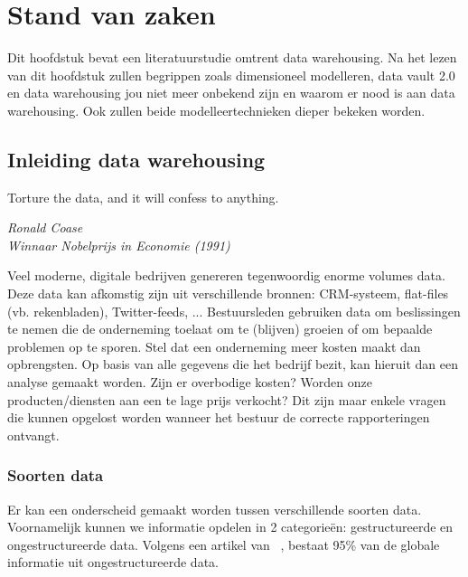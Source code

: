 \chapter{Stand van zaken}
\label{ch:stand-van-zaken}



Dit hoofdstuk bevat een literatuurstudie omtrent data warehousing. Na het lezen van dit hoofdstuk zullen begrippen zoals dimensioneel modelleren, data vault 2.0 en data warehousing jou niet meer onbekend zijn en waarom er nood is aan data warehousing. Ook zullen beide modelleertechnieken dieper bekeken worden.

\section{Inleiding data warehousing}

\epigraph{Torture the data, and it will confess to anything. }{\textit{Ronald Coase \\ Winnaar Nobelprijs in Economie (1991)}}

Veel moderne, digitale bedrijven genereren tegenwoordig enorme volumes data. Deze data kan afkomstig zijn uit verschillende bronnen: CRM-systeem, flat-files (vb. rekenbladen), Twitter-feeds, ... Bestuursleden gebruiken data om beslissingen te nemen die de onderneming toelaat om te (blijven) groeien of om bepaalde problemen op te sporen. Stel dat een onderneming meer kosten maakt dan opbrengsten. Op basis van alle gegevens die het bedrijf bezit, kan hieruit dan een analyse gemaakt worden. Zijn er overbodige kosten? Worden onze producten/diensten aan een te lage prijs verkocht? Dit zijn maar enkele vragen die kunnen opgelost worden wanneer het bestuur de correcte rapporteringen ontvangt. 

\subsection{Soorten data}
Er kan een onderscheid gemaakt worden tussen verschillende soorten data. Voornamelijk kunnen we informatie opdelen in 2 categorieën: gestructureerde en ongestructureerde data. Volgens een artikel van ~\textcite{Langseth2005}, bestaat 95\% van de globale informatie uit ongestructureerde data. 

